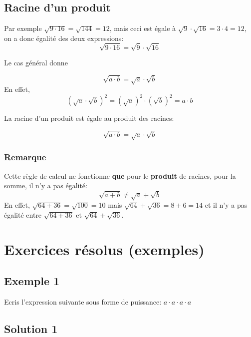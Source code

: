 \documentclass[
  12pt,
]{book}
\begin{document}
\hypertarget{racine-dun-produit}{%
\subsection{Racine d'un produit}\label{racine-dun-produit}}

Par exemple \(\sqrt{9\cdot 16}=\sqrt{144}=12\), mais ceci est égale à \(\sqrt{9}\cdot \sqrt{16}=3\cdot 4=12\), on a donc égalité des deux expressions:
\[\sqrt{9\cdot 16}=\sqrt{9}\cdot\sqrt{16}\]

Le cas général donne

\[\sqrt{a\cdot b}=\sqrt{a}\cdot\sqrt{b}\]
En effet, \[(\sqrt{a}\cdot\sqrt{b})^2=(\sqrt{a})^2\cdot(\sqrt{b})^2= a\cdot b\]

\begin{reglebox}
La racine d'un produit est égale au produit des racines:

\[\sqrt{a\cdot b} = \sqrt{a}\cdot\sqrt{b}\]

\end{reglebox}

\hypertarget{remarque}{%
\subsubsection{Remarque}\label{remarque}}

Cette règle de calcul ne fonctionne \textbf{que} pour le \textbf{produit} de racines, pour la somme, il n'y a pas égalité:
\[\sqrt{a+b}\neq\sqrt{a}+\sqrt{b}\]
En effet, \(\sqrt{64+36}=\sqrt{100}= 10\) mais \(\sqrt{64}+\sqrt{36}=8+6=14\) et il n'y a pas égalité entre \(\sqrt{64+36}\) et \(\sqrt{64}+\sqrt{36}\).

\hypertarget{exercices-ruxe9solus-exemples}{%
\section{Exercices résolus (exemples)}\label{exercices-ruxe9solus-exemples}}

\hypertarget{exemple-1-1}{%
\subsection{Exemple 1}\label{exemple-1-1}}

Ecris l'expression suivante sous forme de puissance: \(a\cdot a\cdot a\cdot a\)

\hypertarget{solution-1}{%
\subsection*{Solution 1}\label{solution-1}}
\end{document}
